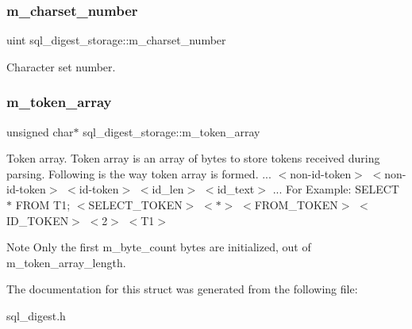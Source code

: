 \subsubsection{\texorpdfstring{m\+\_\+charset\+\_\+number}{m\_charset\_number}}
{\footnotesize\ttfamily uint sql\+\_\+digest\+\_\+storage\+::m\+\_\+charset\+\_\+number}

Character set number. \mbox{\label{structsql__digest__storage_ab295f51157fe09403347b5a329c9becd}} 
\subsubsection{\texorpdfstring{m\+\_\+token\+\_\+array}{m\_token\_array}}
{\footnotesize\ttfamily unsigned char$\ast$ sql\+\_\+digest\+\_\+storage\+::m\+\_\+token\+\_\+array}

Token array. Token array is an array of bytes to store tokens received during parsing. Following is the way token array is formed. ... $<$non-\/id-\/token$>$ $<$non-\/id-\/token$>$ $<$id-\/token$>$ $<$id\+\_\+len$>$ $<$id\+\_\+text$>$ ... For Example\+: S\+E\+L\+E\+CT $\ast$ F\+R\+OM T1; $<$S\+E\+L\+E\+C\+T\+\_\+\+T\+O\+K\+EN$>$ $<$$\ast$$>$ $<$F\+R\+O\+M\+\_\+\+T\+O\+K\+EN$>$ $<$I\+D\+\_\+\+T\+O\+K\+EN$>$ $<$2$>$ $<$T1$>$

\begin{DoxyNote}{Note}
Only the first {\ttfamily m\+\_\+byte\+\_\+count} bytes are initialized, out of {\ttfamily m\+\_\+token\+\_\+array\+\_\+length}. 
\end{DoxyNote}


The documentation for this struct was generated from the following file\+:\begin{DoxyCompactItemize}
\item 
sql\+\_\+digest.\+h\end{DoxyCompactItemize}
